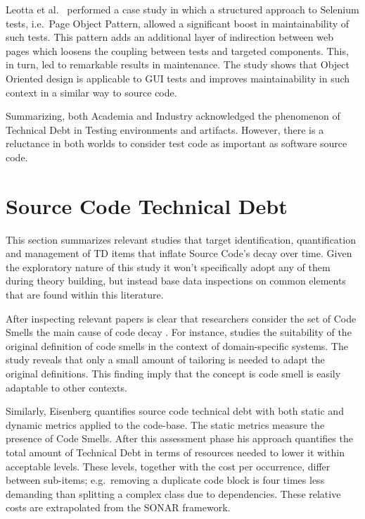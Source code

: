 Leotta et al.\ \cite{pageObjectPattern} performed a case study in which a structured approach to Selenium tests, i.e.\ Page Object Pattern, allowed a significant boost in maintainability of such tests. This pattern adds an additional layer of indirection between web pages which loosens the coupling between tests and targeted components. This, in turn, led to remarkable results in maintenance. The study shows that Object Oriented design is applicable to GUI tests and improves maintainability in such context in a similar way to source code.

Summarizing, both Academia and Industry acknowledged the phenomenon of Technical Debt in Testing environments and artifacts. However, there is a reluctance in both worlds to consider test code as important as software source code.

\section{Source Code Technical Debt} \label{source_code_technical_debt}

This section summarizes relevant studies that target identification, quantification and management of TD items that inflate Source Code's decay over time. Given the exploratory nature of this study it won't specifically adopt any of them during theory building, but instead base data inspections on common elements that are found within this literature.

After inspecting relevant papers is clear that researchers consider the set of Code Smells \cite{code_smell_definition} the main cause of code decay \cite{mapping_study_td}. For instance, \cite{domain_specific_code_smells} studies the suitability of the original definition of code smells in the context of domain-specific systems. The study reveals that only a small amount of tailoring is needed to adapt the original definitions. This finding imply that the concept is code smell is easily adaptable to other contexts. 

Similarly, Eisenberg \cite{threshold_approach_to_td} quantifies source code technical debt with both static and dynamic metrics applied to the code-base. The static metrics measure the presence of Code Smells. After this assessment phase his approach quantifies the total amount of Technical Debt in terms of resources needed to lower it within acceptable levels. These levels, together with the cost per occurrence, differ between sub-items; e.g.\ removing a duplicate code block is four times less demanding than splitting a complex class due to dependencies. These relative costs are extrapolated from the SONAR \cite{sonar_evaluate_td} framework.

